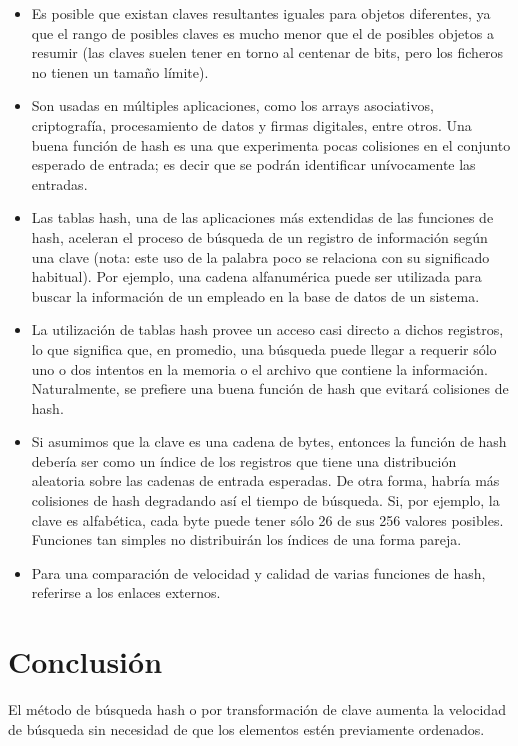 \documentclass[letterpaper,openright,12pt]{report}
\begin{document}
\begin{itemize}
\itemsep1pt\parskip0pt
\item
  Es posible que existan claves resultantes iguales para objetos
  diferentes, ya que el rango de posibles claves es mucho menor que el
  de posibles objetos a resumir (las claves suelen tener en torno al
  centenar de bits, pero los ficheros no tienen un tamaño límite).
\item
  Son usadas en múltiples aplicaciones, como los arrays asociativos,
  criptografía, procesamiento de datos y firmas digitales, entre otros.
  Una buena función de hash es una que experimenta pocas colisiones en
  el conjunto esperado de entrada; es decir que se podrán identificar
  unívocamente las entradas.
\item
  Las tablas hash, una de las aplicaciones más extendidas de las
  funciones de hash, aceleran el proceso de búsqueda de un registro de
  información según una clave (nota: este uso de la palabra poco se
  relaciona con su significado habitual). Por ejemplo, una cadena
  alfanumérica puede ser utilizada para buscar la información de un
  empleado en la base de datos de un sistema.
\item
  La utilización de tablas hash provee un acceso casi directo a dichos
  registros, lo que significa que, en promedio, una búsqueda puede
  llegar a requerir sólo uno o dos intentos en la memoria o el archivo
  que contiene la información. Naturalmente, se prefiere una buena
  función de hash que evitará colisiones de hash.
\item
  Si asumimos que la clave es una cadena de bytes, entonces la función
  de hash debería ser como un índice de los registros que tiene una
  distribución aleatoria sobre las cadenas de entrada esperadas. De otra
  forma, habría más colisiones de hash degradando así el tiempo de
  búsqueda. Si, por ejemplo, la clave es alfabética, cada byte puede
  tener sólo 26 de sus 256 valores posibles. Funciones tan simples no
  distribuirán los índices de una forma pareja.
\item
  Para una comparación de velocidad y calidad de varias funciones de
  hash, referirse a los enlaces externos.
\end{itemize}
\newpage
\section{Conclusión}

El método de búsqueda hash o por transformación de clave aumenta la
velocidad de búsqueda sin necesidad de que los elementos estén
previamente ordenados.
\end{document}
